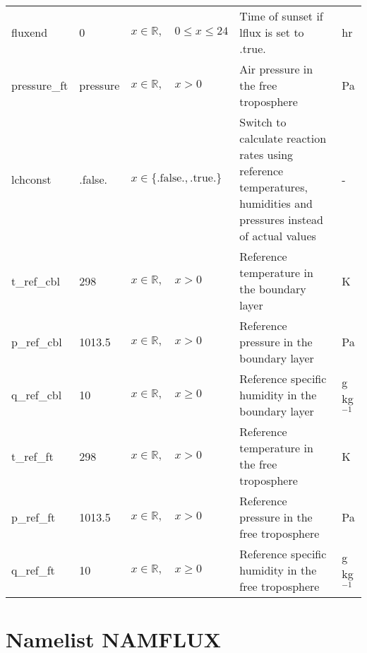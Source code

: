\documentclass[twoside,11pt,fleqn,a4paper,english,openright]{report}
\begin{document}
\begin{center}
\begin{supertabular}{|l|p{1.6cm}|p{4cm}|p{6cm}|l|}
fluxend		&	0			& $x \in \mathbb{R}, \quad 0 \leq x \leq 24$	& Time of sunset if lflux is set to .true.	&	hr\\
pressure\_ft	&	pressure	&	$x \in \mathbb{R}, \quad x > 0$		& Air pressure in the free troposphere	&	Pa\\
lchconst	&	.false.	&	$x\in\{\text{.false.},\text{.true.}\}$	& Switch to calculate reaction rates using reference temperatures, humidities and pressures instead of actual values	& -\\
t\_ref\_cbl	&	298		& $x \in \mathbb{R}, \quad x > 0$				& Reference temperature in the boundary layer	&	K\\
p\_ref\_cbl	&	1013.5	& $x \in \mathbb{R}, \quad x > 0$			& Reference pressure in the boundary layer	&	Pa\\
q\_ref\_cbl	&	10		& $x \in \mathbb{R}, \quad x \geq 0$		& Reference specific humidity in the boundary layer	&	g kg$^{-1}$\\
t\_ref\_ft	&	298		& $x \in \mathbb{R}, \quad x > 0$				& Reference temperature in the free troposphere	&	K\\
p\_ref\_ft	&	1013.5	& $x \in \mathbb{R}, \quad x > 0$			& Reference pressure in the free troposphere	&	Pa\\
q\_ref\_ft	&	10		& $x \in \mathbb{R}, \quad x \geq 0$		& Reference specific humidity in the free troposphere	&	g kg$^{-1}$\\
\end{supertabular}
\end{center}
 
\section{Namelist NAMFLUX}\label{par:namflux}
\end{document}
